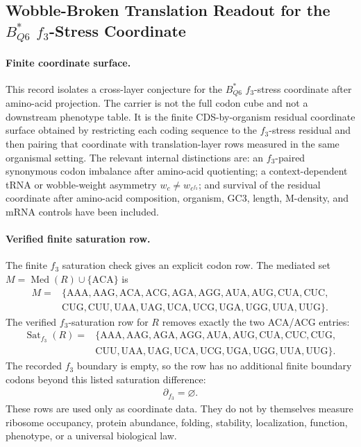 \subsection{Wobble-Broken Translation Readout for the $B^*_{Q6}$ $f_3$-Stress Coordinate}\label{subsec:q6-f3-stress-wobble-broken-translation-readout-cross-layer}

\paragraph{Finite coordinate surface.}
This record isolates a cross-layer conjecture for the $B^*_{Q6}$ $f_3$-stress coordinate after amino-acid projection. The carrier is not the full codon cube and not a downstream phenotype table. It is the finite CDS-by-organism residual coordinate surface obtained by restricting each coding sequence to the $f_3$-stress residual and then pairing that coordinate with translation-layer rows measured in the same organismal setting. The relevant internal distinctions are: an $f_3$-paired synonymous codon imbalance after amino-acid quotienting; a context-dependent tRNA or wobble-weight asymmetry $w_c \neq w_{c^{f_3}}$; and survival of the residual coordinate after amino-acid composition, organism, GC3, length, M-density, and mRNA controls have been included.

\paragraph{Verified finite saturation row.}
The finite $f_3$ saturation check gives an explicit codon row. The mediated set $M=\operatorname{Med}(R)\cup\{\mathrm{ACA}\}$ is
$$\begin{aligned}
M={}&\{\mathrm{AAA},\mathrm{AAG},\mathrm{ACA},\mathrm{ACG},\mathrm{AGA},\mathrm{AGG},\mathrm{AUA},\mathrm{AUG},\mathrm{CUA},\mathrm{CUC},\\
&\mathrm{CUG},\mathrm{CUU},\mathrm{UAA},\mathrm{UAG},\mathrm{UCA},\mathrm{UCG},\mathrm{UGA},\mathrm{UGG},\mathrm{UUA},\mathrm{UUG}\}.
\end{aligned}$$
The verified $f_3$-saturation row for $R$ removes exactly the two ACA/ACG entries:
$$\begin{aligned}
\operatorname{Sat}_{f_3}(R)={}&\{\mathrm{AAA},\mathrm{AAG},\mathrm{AGA},\mathrm{AGG},\mathrm{AUA},\mathrm{AUG},\mathrm{CUA},\mathrm{CUC},\mathrm{CUG},\\
&\mathrm{CUU},\mathrm{UAA},\mathrm{UAG},\mathrm{UCA},\mathrm{UCG},\mathrm{UGA},\mathrm{UGG},\mathrm{UUA},\mathrm{UUG}\}.
\end{aligned}$$
The recorded $f_3$ boundary is empty, so the row has no additional finite boundary codons beyond this listed saturation difference:
$$\begin{aligned}
\partial_{f_3}=\varnothing.
\end{aligned}$$
These rows are used only as coordinate data. They do not by themselves measure ribosome occupancy, protein abundance, folding, stability, localization, function, phenotype, or a universal biological law.

